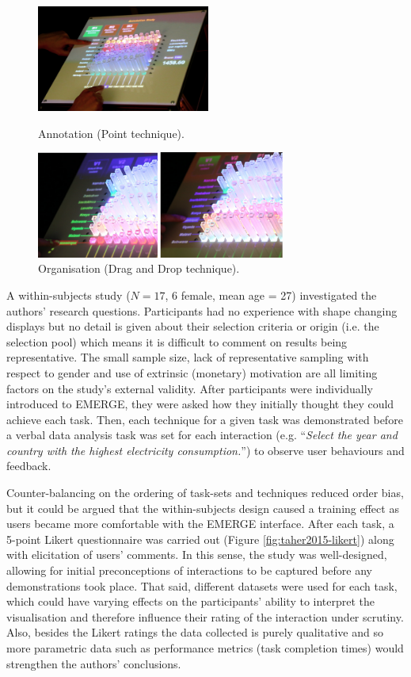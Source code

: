 \documentclass[11pt]{article}
\begin{document}
\begin{figure}[H]
\centering
  \includegraphics[height=3.5cm]{img/taher2015-annotation.png}
  \caption{Annotation (Point technique).}\label{fig:taher2015-annotation}
\endminipage\hfill
{}%
\centering
  \includegraphics[height=3.5cm]{img/taher2015-organize.png}
  \caption{Organisation (Drag and Drop technique).}\label{fig:taher2015-organize}
\endminipage
\end{figure}

A within-subjects study ($N=17$, 6 female, mean age = 27) investigated the authors' research questions. Participants had no experience with shape changing displays but no detail is given about their selection criteria or origin (i.e. the selection pool) which means it is difficult to comment on results being representative. The small sample size, lack of representative sampling with respect to gender and use of extrinsic (monetary) motivation are all limiting factors on the study's external validity. After participants were individually introduced to EMERGE, they were asked how they initially thought they could achieve each task. Then, each technique for a given task was demonstrated before a verbal data analysis task was set for each interaction (e.g. ``\textit{Select the year and country with the highest electricity consumption.}'') to observe user behaviours and feedback. 

Counter-balancing on the ordering of task-sets and techniques reduced order bias, but it could be argued that the within-subjects design caused a training effect as users became more comfortable with the EMERGE interface. After each task, a 5-point Likert questionnaire was carried out (Figure \ref{fig:taher2015-likert}) along with elicitation of users' comments. In this sense, the study was well-designed, allowing for initial preconceptions of interactions to be captured before any demonstrations took place. That said, different datasets were used for each task, which could have varying effects on the participants' ability to interpret the visualisation and therefore influence their rating of the interaction under scrutiny. Also, besides the Likert ratings the data collected is purely qualitative and so more parametric data such as performance metrics (task completion times) would strengthen the authors' conclusions.
\end{document}
